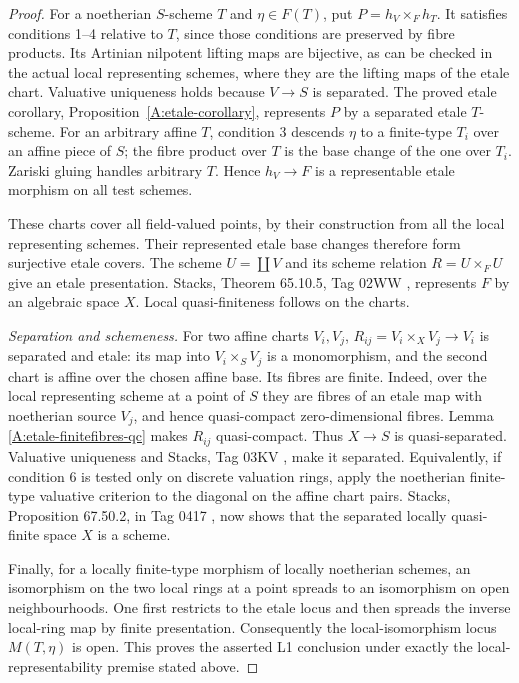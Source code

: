 \begin{proof}
For a noetherian $S$-scheme $T$ and $\eta\in F(T)$, put
$P=h_V\times_Fh_T$. It satisfies conditions 1--4 relative to $T$,
since those conditions are preserved by fibre products. Its
Artinian nilpotent lifting maps are bijective, as can be checked
in the actual local representing schemes, where they are the
lifting maps of the etale chart. Valuative uniqueness holds because
$V\to S$ is separated. The proved etale corollary,
Proposition~\ref{A:etale-corollary}, represents $P$ by a separated
etale $T$-scheme. For an arbitrary affine $T$, condition 3 descends
$\eta$ to a finite-type $T_i$ over an affine piece of $S$; the
fibre product over $T$ is the base change of the one over $T_i$.
Zariski gluing handles arbitrary $T$. Hence $h_V\to F$ is a
representable etale morphism on all test schemes.

These charts cover all field-valued points, by their construction
from all the local representing schemes. Their represented etale
base changes therefore form surjective etale covers. The scheme
$U=\coprod V$ and its scheme relation $R=U\times_FU$ give an
etale presentation. Stacks, Theorem 65.10.5, Tag 02WW
\cite{Stacks02WW}, represents $F$ by an algebraic space $X$.
Local quasi-finiteness follows on the charts.

\emph{Separation and schemeness.} For two affine charts $V_i,V_j$,
$R_{ij}=V_i\times_XV_j\to V_i$ is separated and etale: its map
into $V_i\times_SV_j$ is a monomorphism, and the second chart is
affine over the chosen affine base. Its fibres are finite. Indeed,
over the local representing scheme at a point of $S$ they are
fibres of an etale map with noetherian source $V_j$, and hence
quasi-compact zero-dimensional fibres. Lemma
\ref{A:etale-finitefibres-qc} makes $R_{ij}$ quasi-compact.
Thus $X\to S$ is quasi-separated. Valuative uniqueness and
Stacks, Tag 03KV \cite{Stacks03KV}, make it separated. Equivalently,
if condition 6 is tested only on discrete valuation rings, apply
the noetherian finite-type valuative criterion to the diagonal
on the affine chart pairs. Stacks, Proposition 67.50.2, in Tag 0417
\cite{Stacks0417}, now shows that the separated locally quasi-finite
space $X$ is a scheme.

Finally, for a locally finite-type morphism of locally noetherian
schemes, an isomorphism on the two local rings at a point spreads
to an isomorphism on open neighbourhoods. One first restricts to
the etale locus and then spreads the inverse local-ring map by
finite presentation. Consequently the local-isomorphism locus
$M(T,\eta)$ is open. This proves the asserted L1 conclusion under
exactly the local-representability premise stated above.
\end{proof}

